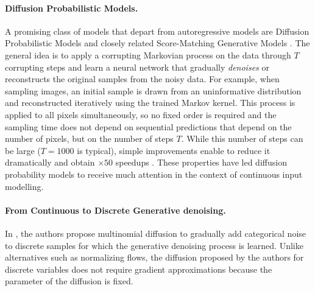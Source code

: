 \documentclass[nohyperref]{article}
\theoremstyle{plain}
\theoremstyle{definition}
\theoremstyle{remark}
\begin{document}
\paragraph{Diffusion Probabilistic Models.}
A promising class of models that depart from autoregressive models are Diffusion Probabilistic Models \cite{sohldickstein2015deep, ho2020denoising} and closely related Score-Matching Generative Models \cite{song2019generative, de2021simulating}. The general idea is to apply a corrupting Markovian process on the data through $T$ corrupting steps and learn a neural network that gradually \textit{denoises} or reconstructs the original samples from the noisy data.
For example, when sampling images, an initial sample is drawn from an uninformative distribution and reconstructed iteratively using the trained Markov kernel. This process is applied to all pixels simultaneously, so no fixed order is required and the sampling time does not depend on sequential predictions that depend on the number of pixels, but on the number of steps $T$. While this number of steps can be large ($T=1000$ is typical), simple improvements enable to reduce it dramatically and obtain $\times 50$ speedups \cite{song2021denoising}. These properties have led diffusion probability models to receive much attention in the context of continuous input modelling.


\paragraph{From Continuous to Discrete Generative denoising.}
In \cite{hoogeboom2021argmax}, the authors propose multinomial diffusion to gradually add categorical noise to discrete samples for which the generative denoising process is learned. Unlike alternatives such as normalizing flows, the diffusion proposed by the authors for discrete variables does not require gradient approximations because the parameter of the diffusion is fixed.
\end{document}
